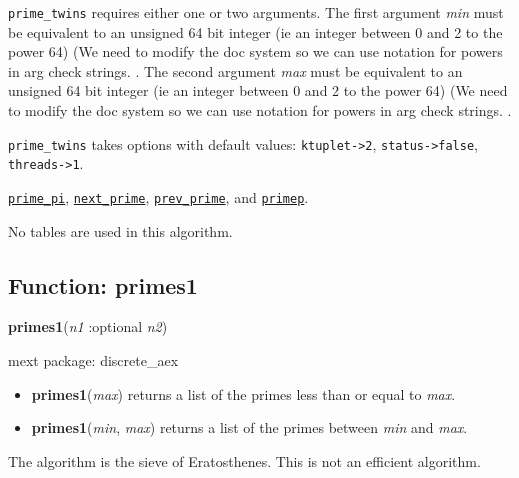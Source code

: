 \documentclass[]{article}
\begin{document}
\vspace{5 pt}

   {\tt prime\_twins} requires either one or two arguments.
    The first argument {\it min} must be equivalent to an unsigned 64 bit integer
 (ie an integer between 0 and 2 to the power 64)
(We need to modify the doc system so we can use notation for powers in arg check strings.
.
    The second argument {\it max} must be equivalent to an unsigned 64 bit integer
 (ie an integer between 0 and 2 to the power 64)
(We need to modify the doc system so we can use notation for powers in arg check strings.
.


\vspace{5 pt}

{\tt prime\_twins} takes options with default values: {\tt ktuplet->2}, {\tt status->false}, {\tt threads->1}.
\vspace{5 pt}


  \hyperlink{prime_pi}{{\tt prime\_pi}}, \hyperlink{next_prime}{{\tt next\_prime}}, \hyperlink{prev_prime}{{\tt prev\_prime}}, and \hyperlink{primep}{{\tt primep}}.

\vspace{5 pt}


No tables are used in this algorithm. 

\vspace{5 pt}


\subsection{Function: primes1\label{sec:primes1}}
\hypertarget{primes1}{}
{\bf primes1}({\it n1} :optional {\it n2})


\noindent mext package: discrete\_aex



\vspace{5 pt}
\begin{itemize}
\item[] {\bf primes1}({\it max})
  returns a list of the primes less than or equal to {\it max}. 

\item[] {\bf primes1}({\it min}, {\it max})
  returns a list of the primes between {\it min} and {\it max}. 

\end{itemize}
The algorithm is the sieve of Eratosthenes. This is not an efficient algorithm. 
\end{document}
